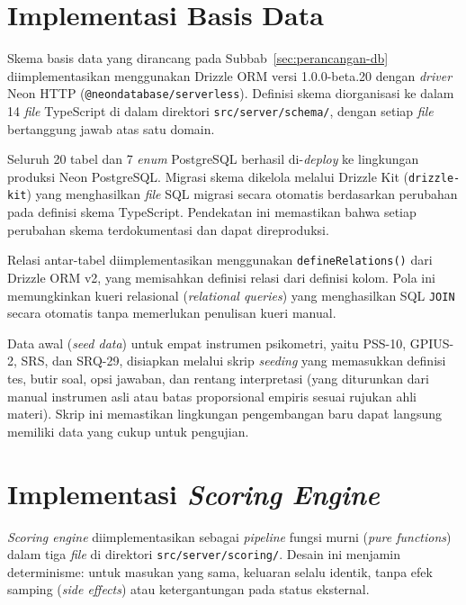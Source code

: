 \section{Implementasi Basis Data}
\label{sec:impl-database}

Skema basis data yang dirancang pada Subbab~\ref{sec:perancangan-db} diimplementasikan menggunakan Drizzle ORM versi 1.0.0-beta.20 dengan \textit{driver} Neon HTTP (\texttt{@neondatabase/serverless}). Definisi skema diorganisasi ke dalam 14 \textit{file} TypeScript di dalam direktori \texttt{src/server/schema/}, dengan setiap \textit{file} bertanggung jawab atas satu domain.

Seluruh 20 tabel dan 7 \textit{enum} PostgreSQL berhasil di-\textit{deploy} ke lingkungan produksi Neon PostgreSQL. Migrasi skema dikelola melalui Drizzle Kit (\texttt{drizzle-kit}) yang menghasilkan \textit{file} SQL migrasi secara otomatis berdasarkan perubahan pada definisi skema TypeScript. Pendekatan ini memastikan bahwa setiap perubahan skema terdokumentasi dan dapat direproduksi.

Relasi antar-tabel diimplementasikan menggunakan \texttt{defineRelations()} dari Drizzle ORM v2, yang memisahkan definisi relasi dari definisi kolom. Pola ini memungkinkan kueri relasional (\textit{relational queries}) yang menghasilkan SQL \texttt{JOIN} secara otomatis tanpa memerlukan penulisan kueri manual.

Data awal (\textit{seed data}) untuk empat instrumen psikometri, yaitu PSS-10, GPIUS-2, SRS, dan SRQ-29, disiapkan melalui skrip \textit{seeding} yang memasukkan definisi tes, butir soal, opsi jawaban, dan rentang interpretasi (yang diturunkan dari manual instrumen asli atau batas proporsional empiris sesuai rujukan ahli materi). Skrip ini memastikan lingkungan pengembangan baru dapat langsung memiliki data yang cukup untuk pengujian.

\section{Implementasi \textit{Scoring Engine}}
\label{sec:impl-scoring}

\textit{Scoring engine} diimplementasikan sebagai \textit{pipeline} fungsi murni (\textit{pure functions}) dalam tiga \textit{file} di direktori \texttt{src/server/scoring/}. Desain ini menjamin determinisme: untuk masukan yang sama, keluaran selalu identik, tanpa efek samping (\textit{side effects}) atau ketergantungan pada status eksternal.

